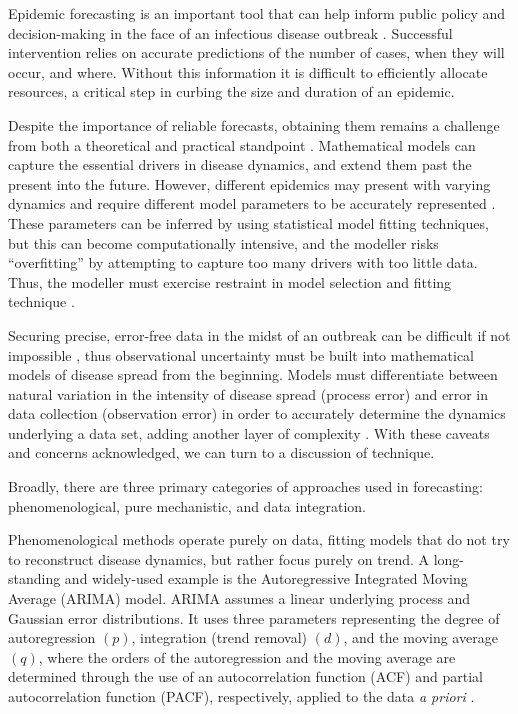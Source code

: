 
Epidemic forecasting is an important tool that can help inform public policy and decision-making in the face of an infectious disease outbreak \cite{Chretien2014}\cite{Nsoesie2014}\cite{Yang2014}. Successful intervention relies on accurate predictions of the number of cases, when they will occur, and where. Without this information it is difficult to efficiently allocate resources, a critical step in curbing the size and duration of an epidemic.

Despite the importance of reliable forecasts, obtaining them remains a challenge from both a theoretical and practical standpoint \cite{Nsoesie2014}. Mathematical models can capture the essential drivers in disease dynamics, and extend them past the present into the future. However, different epidemics may present with varying dynamics and require different model parameters to be accurately represented \cite{Camacho2011}. These parameters can be inferred by using statistical model fitting techniques, but this can become computationally intensive, and the modeller risks ``overfitting'' by attempting to capture too many drivers with too little data. Thus, the modeller must exercise restraint in model selection and fitting technique \cite{Babyak2004}.

Securing precise, error-free data in the midst of an outbreak can be difficult if not impossible \cite{Shaman2014}, thus observational uncertainty must be built into mathematical models of disease spread from the beginning. Models must differentiate between natural variation in the intensity of disease spread (process error) and error in data collection (observation error) in order to accurately determine the dynamics underlying a data set, adding another layer of complexity \cite{King2015}. With these caveats and concerns acknowledged, we can turn to a discussion of technique.

Broadly, there are three primary categories of approaches used in forecasting: phenomenological, pure mechanistic, and data integration.

Phenomenological methods operate purely on data, fitting models that do not try to reconstruct disease dynamics, but rather focus purely on trend. A long-standing and widely-used example is the Autoregressive Integrated Moving Average (ARIMA) model. ARIMA assumes a linear underlying process and Gaussian error distributions. It uses three parameters representing the degree of autoregression $(p)$, integration (trend removal) $(d)$, and the moving average $(q)$, where the orders of the autoregression and the moving average are determined through the use of an autocorrelation function (ACF) and partial autocorrelation function (PACF), respectively, applied to the data \textit{a priori} \cite{Zhang2013}.

